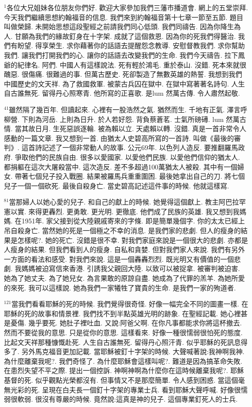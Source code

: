 \documentclass{book}
\begin{document}
$^{1}$各位大兄姐妹各位朋友你們好.
歡迎大家參加我們三藩市播道會.
網上的五堂崇拜.
今天我們繼續思想約翰福音的信息.
我們來到約翰福音第十七章一節至五節.
題目叫做榮歸.
未開始思想這段聖經之前請我們同心低頭.
我們同禱告.
因為你降生為人.
甘願為我們的緣故釘身在十字架.
成就了這個救恩.
因為你的死我們得醫治.
我們有盼望.
得享榮生.
求你藉著你的話語去提醒怨念教導.
安慰督教我們.
求你幫助我們.
讓我們打開我們的心.
讓你的話語去改變我們的生命.
我們今天禱告.
拉下鳳爺的紀律名.
阿們.
中國人有這樣說法.
死有輕於鴻毛.
重於泰山.
沒錯.
死本來就很醜惡.
很傷痛.
很難過的事.
但萬古歷史.
死卻製造了無數英雄的熱誓.
我想到我們中國歷史的文天祥.
為了救國救軍.
被蒙古兵囚在獄中.
在獄中寫著著名詩句.
人生自古誰無死.
留得丹心照寒青.
他所寫的正喜歌.
是lum 然萬古傳.
令人肅然起敬.

$^{41}$雖然隔了幾百年.
但讀起來.
心裡有一股浩然之氣.
猶然而生.
千地有正氣.
澤言呼柳營.
下則為河岳.
上則為日升.
於人若好怨.
背負蔡蒼茗.
士氣所磅礡.
lum 然萬古情.
當其故日月.
生死惡誤逐輪.
被為賴以立.
天處賴以轉.
沒錯.
真是一首非常令人感動的一篇文章.
我又想到一首.
由猶太人史碧高所寫的一首詩.
叫做《最後的審判》.
這首詩記述了一個非常動人的故事.
公元69年.
以色列人造反.
要推翻羅馬政府.
爭取他們的民族自由.
很多以愛國家.
以愛他們民族.
以愛他們信仰的猶太人.
都捐軀在這次大屠殺當中.
這次造反.
差不多超過100萬猶太人被殺.
其中有一個婦女.
帶著七個兒子投入戰圈.
結果被羅馬兵重重圍困.
最後她拿出自己的刀.
將七個兒子一個一個砍死.
最後自殺身亡.
當史碧高記述這件事的時候.
他就這樣寫.

$^{81}$當那婦人以她心愛的兒子.
和自己的獻上的時候.
她覺得這個獻上.
教主阿巴拉罕憲以實.
來得更轟烈.
更勇敢.
更光明.
更徹底.
他們成了民族的英雄.
我又想到我媽媽.
在1951年.
家父接到從大陸親戚寄來的字條.
即是簡單幾個字.
你的太太已經上吊自殺身亡.
當然她的死是一個極之不幸的消息.
是我們家的悲劇.
但人的瘦身的結果是怎樣呢?.
她的死亡.
沒錯是很不幸.
對我們家庭來說是一個很大的悲劇.
亦都是人瘦身的結果.
但我們看到人的瘦身.
自私和貪婪.
但對我們家人來說.
我們有另外一方面的看法和感受.
對我們來說.
這是一個轟轟烈烈.
既光明又有價值的一個悲劇.
我媽媽被迫寫信來香港.
引誘我父親回大陸.
以致可以被捉拿.
被審判被迫害.
她為了她丈夫.
為了她兒女.
為言果敢的原諒自盡.
她成為了代罪的羔羊.
為她所愛的來死.
我可以這樣說.
她為我們一家犧牲了寶貴的生命.
是我們一家的殉道者.

$^{121}$當我們看看耶穌的死的時候.
我們覺得很奇怪.
好像一幅完全不同的圖畫一樣.
在耶穌的死的故事和情景裡.
我們找不到半點英雄光明的跡象.
在聖經記載.
她心裡甚是憂傷.
幾乎要死.
她肚子裡吐血.
又說:阿爸父啊.
在你凡事都能求你將這杯撤去.
然而不要從我的意思.
只是從你的意思.
這樣看來.
好像一種很懦弱很怕死的態度.
比起文天祥那種慷慨赴死.
人生自古誰無死.
留得丹心照汗青.
似乎耶穌的死訊息得多了.
另外馬克福音更加記載.
當耶穌被釘十字架的時候.
大聲喊著說:我神啊我神.
為什麼離棄我呢?.
我們奇怪了.
為什麼耶穌會這樣叫呢?.
難道是因為搞革命失敗.
在患烈失望不平之際.
提出一個控訴.
神啊神啊為什麼你在這時候離棄我呢?.
耶穌基督的死.
似乎觀點光榮都沒有.
但事情又不是那麼簡單.
令人感到困惑.
當這個毫無光彩的死.
呈現在白夫長一個釘十字架的專業士兵.
看到耶穌大聲呼喊.
好像很懦弱很軟弱.
很沒有尊嚴的時候.
竟然說:這真是神的兒子.
這個專業釘死人的士兵.
\end{document}
